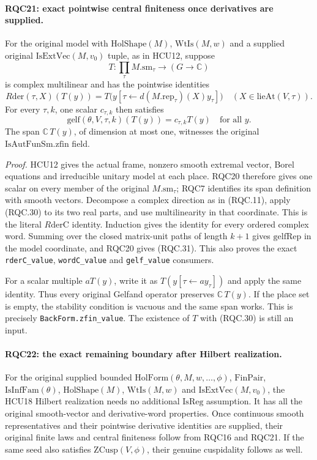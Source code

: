 \paragraph{RQC21: exact pointwise central finiteness once derivatives are supplied.}
\label{claim:RQC21}
For the original model with \(\mathrm{HolShape}(M)\),
\(\mathrm{WtIs}(M,w)\) and a supplied original
\(\mathrm{IsExtVec}(M,v_0)\) tuple, as in HCU12, suppose
\[
 T:\prod_\tau M.\mathrm{sm}_\tau\longrightarrow(G\to\mathbb C)
\]
is complex multilinear and has the pointwise identities
\[
 R\mathrm{der}(\tau,X)(T(y))
  =T\bigl(y[\tau\leftarrow d(M.\mathrm{rep}_\tau)(X)y_\tau]\bigr)
 \quad(X\in\mathrm{lieAt}(V,\tau)).
 \tag{RQC.30}
\]
For every \(\tau,k\), one scalar \(c_{\tau,k}\) then satisfies
\[
 \mathrm{gelf}(\theta,V,\tau,k)(T(y))=c_{\tau,k}T(y)
 \quad\text{for all }y.
 \tag{RQC.31}
\]
The span \(\mathbb C\,T(y)\), of dimension at most one, witnesses
the original \(\mathrm{IsAutFunSm.zfin}\) field.

\emph{Proof.}
HCU12 gives the actual frame, nonzero smooth extremal vector,
Borel equations and irreducible unitary model at each place.
RQC20 therefore gives one scalar on every member of the original
\(M.\mathrm{sm}_\tau\); RQC7 identifies its span definition with
smooth vectors.
Decompose a complex direction as in (RQC.11), apply (RQC.30)
to its two real parts, and use multilinearity in that coordinate.
This is the literal \(R\mathrm{derC}\) identity.
Induction gives the identity for every ordered complex word.
Summing over the closed matrix-unit paths of length \(k+1\)
gives \(\mathrm{gelfRep}\) in the model coordinate, and RQC20
gives (RQC.31).  This also proves the exact
\texttt{rderC\_value}, \texttt{wordC\_value} and
\texttt{gelf\_value} consumers.

For a scalar multiple \(aT(y)\), write it as
\(T(y[\tau\leftarrow ay_\tau])\) and apply the same identity.
Thus every original Gelfand operator preserves \(\mathbb C\,T(y)\).
If the place set is empty, the stability condition is vacuous
and the same span works.
This is precisely \texttt{BackForm.zfin\_value}.
The existence of \(T\) with (RQC.30) is still an input.

\paragraph{RQC22: the exact remaining boundary after Hilbert realization.}
\label{claim:RQC22}
For the original supplied bounded \(\mathrm{HolForm}(\theta,M,w,\ldots,\phi)\),
\(\mathrm{FinPair}\), \(\mathrm{IsInfFam}(\theta)\),
\(\mathrm{HolShape}(M)\), \(\mathrm{WtIs}(M,w)\) and
\(\mathrm{IsExtVec}(M,v_0)\),
the HCU18 Hilbert realization needs no additional
\(\mathrm{IsReg}\) assumption.
It has all the original smooth-vector and derivative-word
properties.  Once continuous smooth representatives and their
pointwise derivative identities are supplied, their original
finite laws and central finiteness follow from RQC16 and RQC21.
If the same seed also satisfies \(\mathrm{ZCusp}(V,\phi)\),
their genuine cuspidality follows as well.

